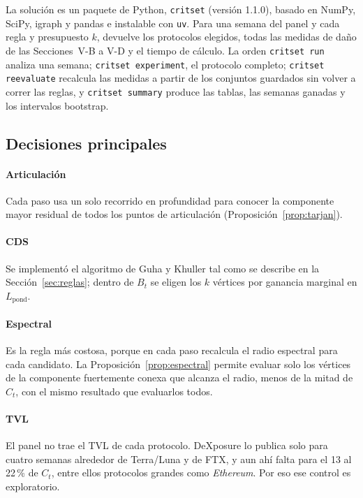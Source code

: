 \documentclass[journal]{IEEEtran}
\begin{document}
La solución es un paquete de Python, \texttt{critset} (versión 1.1.0), basado
en NumPy, SciPy, igraph y pandas e instalable con \texttt{uv}. Para una semana
del panel y cada regla y presupuesto $k$, devuelve los protocolos elegidos, todas
las medidas de daño de las Secciones~V-B a V-D y el tiempo de cálculo. La orden
\texttt{critset run} analiza una semana; \texttt{critset experiment}, el
protocolo completo; \texttt{critset reevaluate} recalcula las medidas a partir
de los conjuntos guardados sin volver a correr las reglas, y
\texttt{critset summary} produce las tablas, las semanas ganadas y los
intervalos bootstrap.

\subsection{Decisiones principales}

\paragraph{Articulación} Cada paso usa un solo recorrido en profundidad para
conocer la componente mayor residual de todos los puntos de articulación
(Proposición~\ref{prop:tarjan}).

\paragraph{CDS} Se implementó el algoritmo de Guha y Khuller tal como se
describe en la Sección~\ref{sec:reglas}; dentro de $B_t$ se eligen los $k$
vértices por ganancia marginal en $L_{\mathrm{pond}}$.

\paragraph{Espectral} Es la regla más costosa, porque en cada paso recalcula el
radio espectral para cada candidato. La Proposición~\ref{prop:espectral}
permite evaluar solo los vértices de la componente fuertemente conexa que
alcanza el radio, menos de la mitad de $C_t$, con el mismo resultado que
evaluarlos todos.

\paragraph{TVL} El panel no trae el TVL de cada protocolo. DeXposure lo publica
solo para cuatro semanas alrededor de Terra/Luna y de FTX, y aun ahí falta para
el 13 al 22\,\% de $C_t$, entre ellos protocolos grandes como \emph{Ethereum}.
Por eso ese control es exploratorio.
\end{document}
